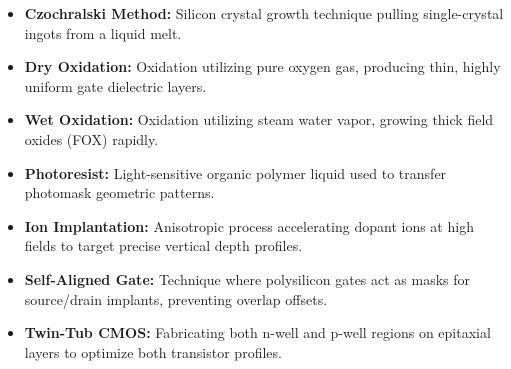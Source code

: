 \documentclass[12pt,a4paper]{article}
\begin{document}
\begin{tcolorbox}[defbox, title={\textbf{One-Line Definitions}}]
\begin{itemize}[leftmargin=*, itemsep=2.5pt, topsep=0pt]
  \item \textbf{Czochralski Method:} Silicon crystal growth technique pulling single-crystal ingots from a liquid melt.
  \item \textbf{Dry Oxidation:} Oxidation utilizing pure oxygen gas, producing thin, highly uniform gate dielectric layers.
  \item \textbf{Wet Oxidation:} Oxidation utilizing steam water vapor, growing thick field oxides (FOX) rapidly.
  \item \textbf{Photoresist:} Light-sensitive organic polymer liquid used to transfer photomask geometric patterns.
  \item \textbf{Ion Implantation:} Anisotropic process accelerating dopant ions at high fields to target precise vertical depth profiles.
  \item \textbf{Self-Aligned Gate:} Technique where polysilicon gates act as masks for source/drain implants, preventing overlap offsets.
  \item \textbf{Twin-Tub CMOS:} Fabricating both n-well and p-well regions on epitaxial layers to optimize both transistor profiles.
\end{itemize}
\end{tcolorbox}
\end{document}
